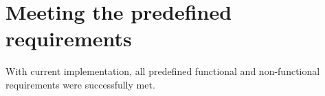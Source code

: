 \section{Meeting the predefined requirements}

With current implementation, all predefined functional and non-functional requirements were successfully met.